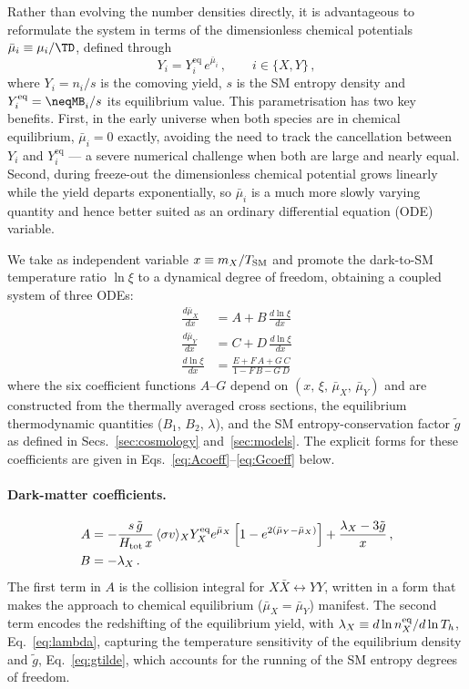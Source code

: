 Rather than evolving the number densities directly, it is advantageous to reformulate the system in terms of the dimensionless chemical potentials $\bar{\mu}_i \equiv \mu_i/\TD$, defined through
\begin{equation}
    Y_i = Y_i^{\text{eq}}\,e^{\bar{\mu}_i}\,, \qquad i \in \{X, Y\}\,,
    \label{eq:chempot_def}
\end{equation}
where $Y_i = n_i/s$ is the comoving yield, $s$ is the SM entropy density and $Y_i^{\text{eq}} = \neqMB_i/s$ its equilibrium value. This parametrisation has two key benefits. First, in the early universe when both species are in chemical equilibrium, $\bar{\mu}_i = 0$ exactly, avoiding the need to track the cancellation between $Y_i$ and $Y_i^{\text{eq}}$ --- a severe numerical challenge when both are large and nearly equal. Second, during freeze-out the dimensionless chemical potential grows linearly while the yield departs exponentially, so $\bar{\mu}_i$ is a much more slowly varying quantity and hence better suited as an ordinary differential equation (ODE) variable.

We take as independent variable $x \equiv m_X/T_{\rm SM}$ and promote
the dark-to-SM temperature ratio $\ln\xi$ to a dynamical degree of
freedom, obtaining a coupled system of three ODEs:
\begin{align}
    \frac{d\bar{\mu}_X}{dx} &= A + B\,\frac{d\ln\xi}{dx} \label{eq:dmuX} \\
    \frac{d\bar{\mu}_Y}{dx} &= C + D\,\frac{d\ln\xi}{dx} \label{eq:dmuY} \\
    \frac{d\ln\xi}{dx} &= \frac{E + F\,A + G\,C}{1 - F\,B - G\,D} \label{eq:dlnxi_full}
\end{align}
where the six coefficient functions $A$--$G$ depend on $(x,\,\xi,\,\bar\mu_X,\,
\bar\mu_Y)$ and are constructed from the thermally averaged cross
sections, the equilibrium thermodynamic quantities ($B_1$, $B_2$,
$\lambda$), and the SM entropy-conservation factor $\tilde g$ as defined in Secs.~\ref{sec:cosmology} and~\ref{sec:models}. The
explicit forms for these coefficients are given in Eqs.~\eqref{eq:Acoeff}--\eqref{eq:Gcoeff}
below.
 
\paragraph{Dark-matter coefficients.}
%
\begin{align}
  A &= -\frac{s\,\tilde g}{H_{\rm tot}\,x}\,\langle\sigma v\rangle_{X} Y_X^{\rm eq}e^{\bar\mu_X}
       \left[1- e^{2(\bar\mu_Y-\bar\mu_X)}
       \right]
       + \frac{\lambda_X - 3\tilde g}{x}\,,
  \label{eq:Acoeff}
  \\
  B &= -\lambda_X\,.
  \label{eq:Bcoeff}
\end{align}
%
The first term in $A$ is the collision integral for $X\bar X \leftrightarrow YY$, written in a form that makes the approach to chemical equilibrium ($\bar\mu_X = \bar\mu_Y$) manifest. The second term encodes the redshifting of the equilibrium yield, with $\lambda_X \equiv d\ln n_X^{\rm eq}/d\ln T_h$, Eq.~\eqref{eq:lambda}, capturing the temperature sensitivity of the equilibrium density and $\tilde g$, Eq.~\eqref{eq:gtilde}, which accounts for the running of the SM entropy degrees of freedom.
 
